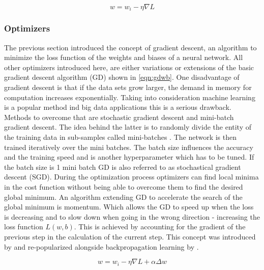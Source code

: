 \begin{equation}
 w = w_i - \eta \nabla L
 \label{eqn:simplegd} 
\end{equation}

\subsubsection{Optimizers}
The previous section introduced the concept of gradient descent, an algorithm to minimize the loss function of
the weights and biases of a neural network. All other optimizers introduced here, are either variations or
extensions of the basic gradient descent algorithm (GD) shown in \ref{eqn:gdwb}. One disadvantage of gradient
descent is that if the data sets grow larger, the demand in memory for computation increases
exponentially. Taking into consideration machine learning is a popular method ind big data applications this
is a serious drawback. Methods to overcome that are stochastic gradient descent and mini-batch gradient
descent. The idea behind the latter is to randomly divide the entity of the training data in sub-samples
called mini-batches \cite{bottou-bousquet-2008}. The network is then trained iteratively over the mini
batches. The batch size influences the accuracy and the training speed and is another hyperparameter which has
to be tuned. If the batch size is 1 mini batch GD is also referred to as stochastical gradient descent (SGD).
During the optimization process optimizers can find local minima in the cost function without being able to
overcome them to find the desired global minimum. An algorithm extending GD to accelerate the search of the
global minimum is momentum. Which allows the GD to speed up when the loss is decreasing and to slow down when
going in the wrong direction - increasing the loss function $L(w,b)$. This is achieved by accounting for the
gradient of the previous step in the calculation of the current step. This concept was introduced by
\cite{polyak1964} and re-popularized alongside backpropagation learning by \cite{rumelhart1988learning}.

\begin{equation}
 w = w_i - \eta \nabla L + \alpha \Delta w
 \label{eqn:momentum}
\end{equation}

